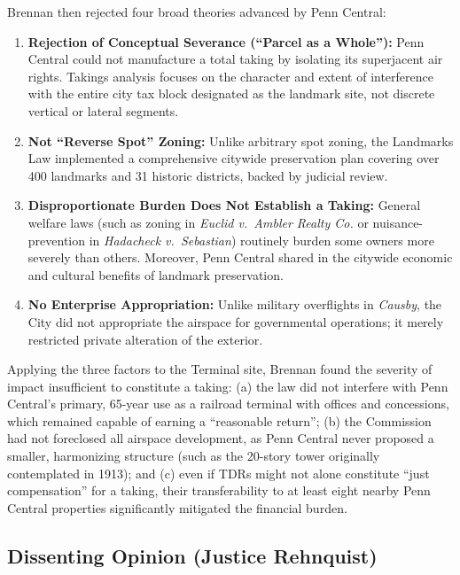 \documentclass[12pt]{article}
\begin{document}
Brennan then rejected four broad theories advanced by Penn Central:
\begin{enumerate}
  \item \textbf{Rejection of Conceptual Severance (``Parcel as a Whole''):} Penn Central could not manufacture a total taking by isolating its superjacent air rights. Takings analysis focuses on the character and extent of interference with the entire city tax block designated as the landmark site, not discrete vertical or lateral segments.
  \item \textbf{Not ``Reverse Spot'' Zoning:} Unlike arbitrary spot zoning, the Landmarks Law implemented a comprehensive citywide preservation plan covering over 400 landmarks and 31 historic districts, backed by judicial review.
  \item \textbf{Disproportionate Burden Does Not Establish a Taking:} General welfare laws (such as zoning in \textit{Euclid v.\ Ambler Realty Co.} or nuisance-prevention in \textit{Hadacheck v.\ Sebastian}) routinely burden some owners more severely than others. Moreover, Penn Central shared in the citywide economic and cultural benefits of landmark preservation.
  \item \textbf{No Enterprise Appropriation:} Unlike military overflights in \textit{Causby}, the City did not appropriate the airspace for governmental operations; it merely restricted private alteration of the exterior.
\end{enumerate}

Applying the three factors to the Terminal site, Brennan found the severity of impact insufficient to constitute a taking: (a) the law did not interfere with Penn Central's primary, 65-year use as a railroad terminal with offices and concessions, which remained capable of earning a ``reasonable return''; (b) the Commission had not foreclosed all airspace development, as Penn Central never proposed a smaller, harmonizing structure (such as the 20-story tower originally contemplated in 1913); and (c) even if TDRs might not alone constitute ``just compensation'' for a taking, their transferability to at least eight nearby Penn Central properties significantly mitigated the financial burden.

\subsection{Dissenting Opinion (Justice Rehnquist)}
\end{document}
